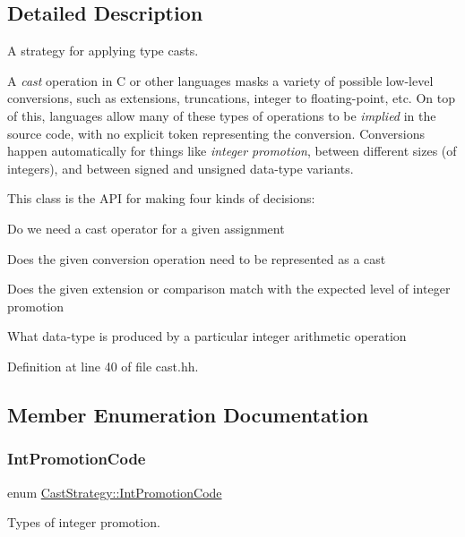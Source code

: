 \subsection{Detailed Description}
A strategy for applying type casts. 

A {\itshape cast} operation in C or other languages masks a variety of possible low-\/level conversions, such as extensions, truncations, integer to floating-\/point, etc. On top of this, languages allow many of these types of operations to be {\itshape implied} in the source code, with no explicit token representing the conversion. Conversions happen automatically for things like {\itshape integer} {\itshape promotion}, between different sizes (of integers), and between signed and unsigned data-\/type variants.

This class is the A\+PI for making four kinds of decisions\+:
\begin{DoxyItemize}
\item Do we need a cast operator for a given assignment
\item Does the given conversion operation need to be represented as a cast
\item Does the given extension or comparison match with the expected level of integer promotion
\item What data-\/type is produced by a particular integer arithmetic operation 
\end{DoxyItemize}

Definition at line 40 of file cast.\+hh.



\subsection{Member Enumeration Documentation}
\mbox{\label{class_cast_strategy_adbe7f8a73e5549983901c96592030747}} 
\subsubsection{\texorpdfstring{IntPromotionCode}{IntPromotionCode}}
{\footnotesize\ttfamily enum \mbox{\hyperlink{class_cast_strategy_adbe7f8a73e5549983901c96592030747}{Cast\+Strategy\+::\+Int\+Promotion\+Code}}}



Types of integer promotion. 

